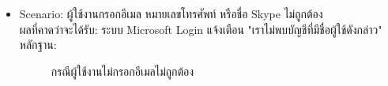 \documentclass[14pt,oneside,openright,a4paper]{cpe-thai-project}
\begin{document}
\begin{itemize}
  \item Scenario: ผู้ใช้งานกรอกอีเมล หมายเลขโทรศัพท์ หรือชื่อ Skype ไม่ถูกต้อง
  \\ผลที่คาดว่าจะได้รับ: ระบบ Microsoft Login แจ้งเตือน "เราไม่พบบัญชีที่มีชื่อผู้ใช้ดังกล่าว"
  \\หลักฐาน:\\
  \begin{figure}[!h]\centering
    \setlength{\fboxrule}{0.5mm} %
    \setlength{\fboxsep}{0.5cm}
    \caption{กรณีผู้ใช้งานไม่กรอกอีเมลไม่ถูกต้อง}\label{fig:LoginPageTest}
  \end{figure}
\end{itemize}

\newpage
\end{document}
